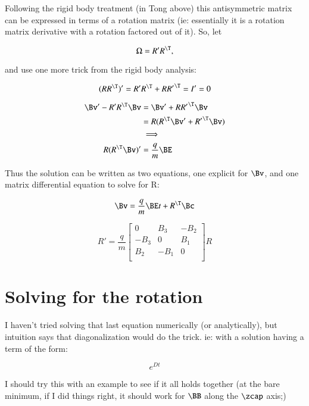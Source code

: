 Following the rigid body treatment (in Tong above) this antisymmetric matrix can be expressed in terms of a rotation matrix (ie: essentially it is a rotation matrix derivative with a rotation factored out of it).  So, let

\begin{equation}\label{eqn:lorentzRotation:n}
\Omega = R' R^\T,
\end{equation}

and use one more trick from the rigid body analysis:

\begin{equation}\label{eqn:lorentzRotation:n}
(RR^\T)' = R' R^\T + R {R'}^\T = I' = 0
\end{equation}

\begin{align*}
\Bv' - R' R^\T \Bv 
&= \Bv' + R {R'}^\T \Bv  \\
&= R (R^\T \Bv' + {R'}^\T \Bv)  \\
&\implies \\
R (R^\T \Bv)' &= \frac{q}{m} \BE
\end{align*}

Thus the solution can be written as two equations, one explicit for $\Bv$, and one matrix differential equation to solve for R:

\begin{equation}\label{eqn:lorentzRotation:n}
\Bv = \frac{q}{m} \BE t + R^\T \Bc
\end{equation}

\begin{equation}\label{eqn:lorentzRotation:n}
R' = \frac{q}{m}
\begin{bmatrix}
0 & B_3 & -B_2 \\
-B_3 & 0 & B_1 \\
B_2 & -B_1 & 0 \\
\end{bmatrix}
R
\end{equation}

\section{Solving for the rotation}

I haven't tried solving that last equation numerically (or analytically), but intuition says that diagonalization would do the trick.  ie: with a solution having a term of the form:

\[
e^{Dt}
\]

I should try this with an example to see if it all holds together (at the bare minimum, if I did things right, it should work for $\BB$ along the $\zcap$ axis;)

